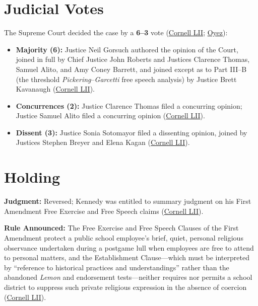 \documentclass[12pt]{article}
\begin{document}
\section{Judicial Votes}
The Supreme Court decided the case by a \textbf{6--3} vote (\href{https://www.law.cornell.edu/supremecourt/text/21-418}{Cornell LII}; \href{https://www.oyez.org/cases/2021/21-418}{Oyez}):
\begin{itemize}
    \item \textbf{Majority (6):} Justice Neil Gorsuch authored the opinion of the Court, joined in full by Chief Justice John Roberts and Justices Clarence Thomas, Samuel Alito, and Amy Coney Barrett, and joined except as to Part III--B (the threshold \textit{Pickering}--\textit{Garcetti} free speech analysis) by Justice Brett Kavanaugh (\href{https://www.law.cornell.edu/supremecourt/text/21-418}{Cornell LII}).
    \item \textbf{Concurrences (2):} Justice Clarence Thomas filed a concurring opinion; Justice Samuel Alito filed a concurring opinion (\href{https://www.law.cornell.edu/supremecourt/text/21-418}{Cornell LII}).
    \item \textbf{Dissent (3):} Justice Sonia Sotomayor filed a dissenting opinion, joined by Justices Stephen Breyer and Elena Kagan (\href{https://www.law.cornell.edu/supremecourt/text/21-418}{Cornell LII}).
\end{itemize}

\section{Holding}
\textbf{Judgment:} Reversed; Kennedy was entitled to summary judgment on his First Amendment Free Exercise and Free Speech claims (\href{https://www.law.cornell.edu/supremecourt/text/21-418}{Cornell LII}).

\textbf{Rule Announced:} The Free Exercise and Free Speech Clauses of the First Amendment protect a public school employee's brief, quiet, personal religious observance undertaken during a postgame lull when employees are free to attend to personal matters, and the Establishment Clause---which must be interpreted by ``reference to historical practices and understandings'' rather than the abandoned \textit{Lemon} and endorsement tests---neither requires nor permits a school district to suppress such private religious expression in the absence of coercion (\href{https://www.law.cornell.edu/supremecourt/text/21-418}{Cornell LII}).
\end{document}

